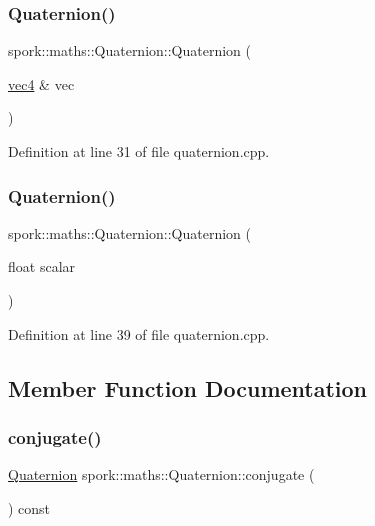 \subsubsection{\texorpdfstring{Quaternion()}{Quaternion()}\hspace{0.1cm}{\footnotesize\ttfamily [5/6]}}
{\footnotesize\ttfamily spork\+::maths\+::\+Quaternion\+::\+Quaternion (\begin{DoxyParamCaption}\item[{\hyperlink{structspork_1_1maths_1_1vec4}{vec4} \&}]{vec }\end{DoxyParamCaption})}



Definition at line 31 of file quaternion.\+cpp.

\mbox{\label{structspork_1_1maths_1_1_quaternion_a5801369b22da4196a60178e2992c3563}} 
\subsubsection{\texorpdfstring{Quaternion()}{Quaternion()}\hspace{0.1cm}{\footnotesize\ttfamily [6/6]}}
{\footnotesize\ttfamily spork\+::maths\+::\+Quaternion\+::\+Quaternion (\begin{DoxyParamCaption}\item[{float}]{scalar }\end{DoxyParamCaption})}



Definition at line 39 of file quaternion.\+cpp.



\subsection{Member Function Documentation}
\mbox{\label{structspork_1_1maths_1_1_quaternion_acecfea67e6ddba5f238f1b23f5bf46a3}} 
\subsubsection{\texorpdfstring{conjugate()}{conjugate()}}
{\footnotesize\ttfamily \hyperlink{structspork_1_1maths_1_1_quaternion}{Quaternion} spork\+::maths\+::\+Quaternion\+::conjugate (\begin{DoxyParamCaption}{ }\end{DoxyParamCaption}) const}



